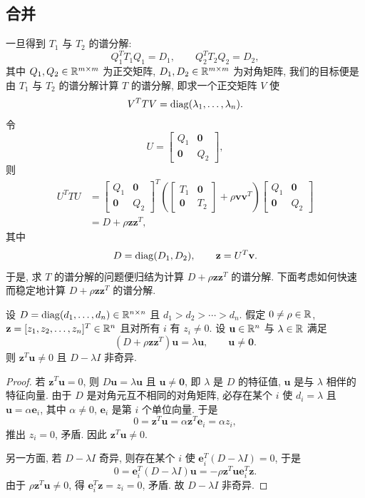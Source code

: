 \subsection{合并}
\label{sec:8-5-2}

一旦得到 $T_1$ 与 $T_2$ 的谱分解:
\[
  Q_1^TT_1Q_1=D_1,
  \qquad
  Q_2^TT_2Q_2=D_2,
\]
其中 $Q_1,Q_2\in\mathbb{R}^{m\times m}$ 为正交矩阵, $D_1,D_2\in\mathbb{R}^{m\times m}$ 为对角矩阵, 我们的目标便是由 $T_1$ 与 $T_2$ 的谱分解计算 $T$ 的谱分解, 即求一个正交矩阵 $V$ 使
\[
  V^TTV=\operatorname{diag}(\lambda_1,\ldots,\lambda_n).
\]
令
\[
  U=\begin{bmatrix}
    Q_1 & \mathbf{0}\\
    \mathbf{0} & Q_2
  \end{bmatrix},
\]
则
\[
  \begin{aligned}
    U^TTU
    &=\begin{bmatrix}
        Q_1 & \mathbf{0}\\
        \mathbf{0} & Q_2
      \end{bmatrix}^T
      \left(\begin{bmatrix}
        T_1 & \mathbf{0}\\
        \mathbf{0} & T_2
      \end{bmatrix}+\rho\mathbf{v}\mathbf{v}^T\right)
      \begin{bmatrix}
        Q_1 & \mathbf{0}\\
        \mathbf{0} & Q_2
      \end{bmatrix}\\
    &=D+\rho\mathbf{z}\mathbf{z}^T,
  \end{aligned}
\]
其中
\[
  D=\operatorname{diag}(D_1,D_2),
  \qquad
  \mathbf{z}=U^T\mathbf{v}.
\]
于是, 求 $T$ 的谱分解的问题便归结为计算 $D+\rho\mathbf{z}\mathbf{z}^T$ 的谱分解. 下面考虑如何快速而稳定地计算 $D+\rho\mathbf{z}\mathbf{z}^T$ 的谱分解.

\begin{lemma}
\label{lem:8-1}
设 $D=\operatorname{diag}(d_1,\ldots,d_n)\in\mathbb{R}^{n\times n}$ 且 $d_1>d_2>\cdots>d_n$. 假定 $0\neq\rho\in\mathbb{R}$, $\mathbf{z}=[z_1,z_2,\ldots,z_n]^T\in\mathbb{R}^n$ 且对所有 $i$ 有 $z_i\neq0$. 设 $\mathbf{u}\in\mathbb{R}^n$ 与 $\lambda\in\mathbb{R}$ 满足
\[
  (D+\rho\mathbf{z}\mathbf{z}^T)\mathbf{u}=\lambda\mathbf{u},
  \qquad \mathbf{u}\neq\mathbf{0}.
\]
则 $\mathbf{z}^T\mathbf{u}\neq0$ 且 $D-\lambda I$ 非奇异.
\end{lemma}

\begin{proof}
若 $\mathbf{z}^T\mathbf{u}=0$, 则 $D\mathbf{u}=\lambda\mathbf{u}$ 且 $\mathbf{u}\neq\mathbf{0}$, 即 $\lambda$ 是 $D$ 的特征值, $\mathbf{u}$ 是与 $\lambda$ 相伴的特征向量. 由于 $D$ 是对角元互不相同的对角矩阵, 必存在某个 $i$ 使 $d_i=\lambda$ 且 $\mathbf{u}=\alpha\mathbf{e}_i$, 其中 $\alpha\neq0$, $\mathbf{e}_i$ 是第 $i$ 个单位向量. 于是
\[
  0=\mathbf{z}^T\mathbf{u}=\alpha\mathbf{z}^T\mathbf{e}_i=\alpha z_i,
\]
推出 $z_i=0$, 矛盾. 因此 $\mathbf{z}^T\mathbf{u}\neq0$.

另一方面, 若 $D-\lambda I$ 奇异, 则存在某个 $i$ 使 $\mathbf{e}_i^T(D-\lambda I)=0$, 于是
\[
  0=\mathbf{e}_i^T(D-\lambda I)\mathbf{u}=-\rho\mathbf{z}^T\mathbf{u}\mathbf{e}_i^T\mathbf{z}.
\]
由于 $\rho\mathbf{z}^T\mathbf{u}\neq0$, 得 $\mathbf{e}_i^T\mathbf{z}=z_i=0$, 矛盾. 故 $D-\lambda I$ 非奇异.
\end{proof}

